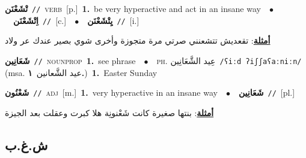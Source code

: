 \documentclass[10pt,a4paper,twoside]{article} %
\begin{document}
\begin{multicols}{2}
{\setlength\topsep{0pt}\textbf{\foreignlanguage{arabic}{تْشَعْنَن}}\ {\color{gray}\texttt{//}\color{black}}\ \textsc{verb}\ [p.]\ \textbf{1.}~be very hyperactive and act in an insane way\ \ $\bullet$\ \ \setlength\topsep{0pt}\textbf{\foreignlanguage{arabic}{اِتْشَعْنَن}}\ {\color{gray}\texttt{//}\color{black}}\ [c.]\ \ $\bullet$\ \ \setlength\topsep{0pt}\textbf{\foreignlanguage{arabic}{يِتْشَعْنَن}}\ {\color{gray}\texttt{//}\color{black}}\ [i.]\  \begin{flushright}\color{gray}\foreignlanguage{arabic}{\textbf{\underline{\foreignlanguage{arabic}{أمثلة}}}: تقعديش تتشعنني صرتي مرة متجوزة وأخرى شوي بصير عندك عر ولاد}\end{flushright}\color{black}} \vspace{2mm}

{\setlength\topsep{0pt}\textbf{\foreignlanguage{arabic}{شَعَانِين}}\ {\color{gray}\texttt{//}\color{black}}\ \textsc{noun\textunderscore prop}\ \textbf{1.}~see phrase\ \ $\bullet$\ \ \textsc{ph.} \color{gray} \foreignlanguage{arabic}{عِيد الشَّعَانِين}\color{black}\ {\color{gray}\texttt{/{\sffamily ʕiːd ʔiʃʃaʕaːniːn}/}\color{black}}\ \color{gray} (msa. \foreignlanguage{arabic}{عيد الشَّعانين}~\foreignlanguage{arabic}{\textbf{١.}})\color{black}\ \textbf{1.}~Easter Sunday\ } \vspace{2mm}

{\setlength\topsep{0pt}\textbf{\foreignlanguage{arabic}{شَعْنُون}}\ {\color{gray}\texttt{//}\color{black}}\ \textsc{adj}\ [m.]\ \textbf{1.}~very hyperactive in an insane way\ \ $\bullet$\ \ \setlength\topsep{0pt}\textbf{\foreignlanguage{arabic}{شَعَانِين}}\ {\color{gray}\texttt{//}\color{black}}\ [pl.]\  \begin{flushright}\color{gray}\foreignlanguage{arabic}{\textbf{\underline{\foreignlanguage{arabic}{أمثلة}}}: بنتها صغيرة كانت شَعْنونِة هلا كبرت وعقلت بعد الجيزة}\end{flushright}\color{black}} \vspace{2mm}

\vspace{-3mm}
\subsection*{\color{blue}\foreignlanguage{arabic}{ش.غ.ب}\color{blue}{}} 


\end{multicols}
\end{document}
